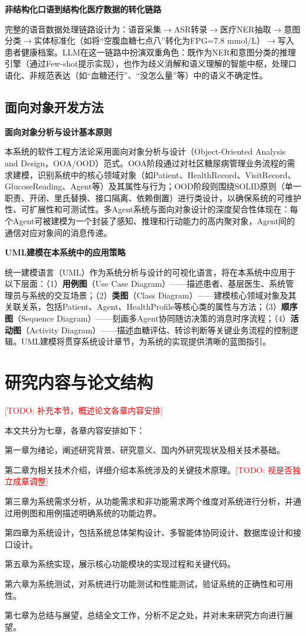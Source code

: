 \noindent\textbf{非结构化口语到结构化医疗数据的转化链路}

完整的语音数据处理链路设计为：语音采集$\to$ASR转录$\to$医疗NER抽取$\to$意图分类$\to$实体标准化（如将``空腹血糖七点八''转化为FPG=7.8 mmol/L）$\to$写入患者健康档案。LLM在这一链路中扮演双重角色：既作为NER和意图分类的推理引擎（通过Few-shot提示实现），也作为歧义消解和语义理解的智能中枢，处理口语化、非规范表达（如``血糖还行''、``没怎么量''等）中的语义不确定性。

\subsection{面向对象开发方法}

\noindent\textbf{面向对象分析与设计基本原则}

本系统的软件工程方法论采用面向对象分析与设计（Object-Oriented Analysis and Design，OOA/OOD）范式。OOA阶段通过对社区糖尿病管理业务流程的需求建模，识别系统中的核心领域对象（如Patient、HealthRecord、VisitRecord、GlucoseReading、Agent等）及其属性与行为；OOD阶段则围绕SOLID原则（单一职责、开闭、里氏替换、接口隔离、依赖倒置）进行类设计，以确保系统的可维护性、可扩展性和可测试性。多Agent系统与面向对象设计的深度契合性体现在：每个Agent可被建模为一个封装了感知、推理和行动能力的高内聚对象，Agent间的通信对应对象间的消息传递。

\noindent\textbf{UML建模在本系统中的应用策略}

统一建模语言（UML）作为系统分析与设计的可视化语言，将在本系统中应用于以下层面：（1）\textbf{用例图}（Use Case Diagram）------描述患者、基层医生、系统管理员与系统的交互场景；（2）\textbf{类图}（Class Diagram）------建模核心领域对象及其关联关系，包括Patient、Agent、HealthProfile等核心类的属性与方法；（3）\textbf{顺序图}（Sequence Diagram）------刻画多Agent协同随访决策的消息时序流程；（4）\textbf{活动图}（Activity Diagram）------描述血糖评估、转诊判断等关键业务流程的控制逻辑。UML建模将贯穿系统设计章节，为系统的实现提供清晰的蓝图指引。


\section{研究内容与论文结构}

\textcolor{red}{[TODO: 补充本节，概述论文各章内容安排]}

本文共分为七章，各章内容安排如下：

第一章为绪论，阐述研究背景、研究意义、国内外研究现状及相关技术基础。

第二章为相关技术介绍，详细介绍本系统涉及的关键技术原理。\textcolor{red}{[TODO: 视是否独立成章调整]}

第三章为系统需求分析，从功能需求和非功能需求两个维度对系统进行分析，并通过用例图和用例描述明确系统的功能边界。

第四章为系统设计，包括系统总体架构设计、多智能体协同设计、数据库设计和接口设计。

第五章为系统实现，展示核心功能模块的实现过程和关键代码。

第六章为系统测试，对系统进行功能测试和性能测试，验证系统的正确性和可用性。

第七章为总结与展望，总结全文工作，分析不足之处，并对未来研究方向进行展望。
